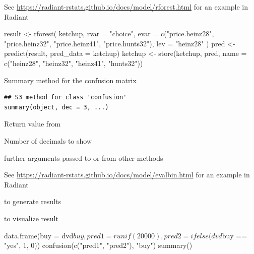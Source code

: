 \documentclass[a4paper]{book}
\begin{document}
%
\begin{Details}
See \url{https://radiant-rstats.github.io/docs/model/rforest.html} for an example in Radiant
\end{Details}
%
\begin{Examples}
\begin{ExampleCode}
result <- rforest(
  ketchup,
  rvar = "choice",
  evar = c("price.heinz28", "price.heinz32", "price.heinz41", "price.hunts32"),
  lev = "heinz28"
)
pred <- predict(result, pred_data = ketchup)
ketchup <- store(ketchup, pred, name = c("heinz28", "heinz32", "heinz41", "hunts32"))

\end{ExampleCode}
\end{Examples}
%
\begin{Description}
Summary method for the confusion matrix
\end{Description}
%
\begin{Usage}
\begin{verbatim}
## S3 method for class 'confusion'
summary(object, dec = 3, ...)
\end{verbatim}
\end{Usage}
%
\begin{Arguments}
\begin{ldescription}
\item[\code{object}] Return value from 

\item[\code{dec}] Number of decimals to show

\item[\code{...}] further arguments passed to or from other methods
\end{ldescription}
\end{Arguments}
%
\begin{Details}
See \url{https://radiant-rstats.github.io/docs/model/evalbin.html} for an example in Radiant
\end{Details}
%
\begin{SeeAlso}
 to generate results

 to visualize result
\end{SeeAlso}
%
\begin{Examples}
\begin{ExampleCode}
data.frame(buy = dvd$buy, pred1 = runif(20000), pred2 = ifelse(dvd$buy == "yes", 1, 0)) %
  confusion(c("pred1", "pred2"), "buy") %
  summary()
\end{ExampleCode}
\end{Examples}
\end{document}
